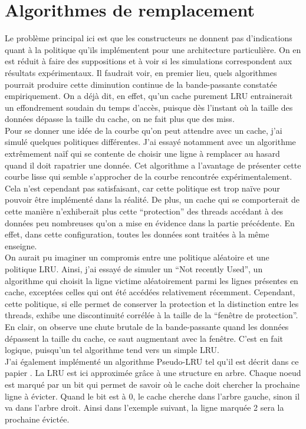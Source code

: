 \documentclass{report}
\begin{document}
\section{Algorithmes de remplacement}
Le problème principal ici est que les constructeurs ne donnent pas d'indications quant
à la politique qu'ils implémentent pour une architecture particulière. On en est 
réduit à faire des suppositions et à voir si les simulations correspondent aux
résultats expérimentaux. Il faudrait voir, en premier lieu, quels algorithmes pourrait
produire cette diminution continue de la bande-passante constatée empiriquement. On a déjà 
dit, en effet, qu'un cache purement LRU entrainerait un effondrement soudain du temps
d'accès, puisque dès l'instant où la taille des données dépasse la taille du cache, on 
ne fait plus que des miss.
\\Pour se donner une idée de la courbe qu'on peut attendre avec un cache, j'ai simulé
quelques politiques différentes. J'ai essayé notamment avec un algorithme extrêmement
naïf qui se contente de choisir une ligne à remplacer au hasard quand il doit rapatrier
une donnée. Cet algorithme a l'avantage de présenter cette courbe lisse qui semble 
s'approcher de la courbe rencontrée expérimentalement. Cela n'est cependant pas 
satisfaisant, car cette politique est trop naïve pour pouvoir être implémenté dans
la réalité. De plus, un cache qui se comporterait de cette manière n'exhiberait plus
cette ``protection'' des threads accédant à des données peu nombreuses qu'on a 
mise en évidence dans la partie précédente. En effet, dans cette configuration,
toutes les données sont traitées à la même enseigne.
\\On aurait pu imaginer un compromis entre une politique aléatoire et une politique
LRU. Ainsi, j'ai essayé de simuler un ``Not recently Used'', un algorithme qui choisit
la ligne victime aléatoirement parmi les lignes présentes en cache, exceptées celles 
qui ont été accédées relativement récemment. Cependant, cette politique, si elle 
permet de conserver la protection et la distinction entre les threads, exhibe une
discontinuité corrélée à la taille de la ``fenêtre de protection''. En clair, on
observe une chute brutale de la bande-passante quand les données dépassent la taille
du cache, ce saut augmentant avec la fenêtre. C'est en fait logique, puisqu'un tel
algorithme tend vers un simple LRU. 
\\J'ai également implémenté un algorithme Pseudo-LRU tel qu'il est décrit dans ce 
papier \cite{plru}. La LRU est ici approximée grâce à une structure en arbre. Chaque
noeud est marqué par un bit qui permet de savoir où le cache doit chercher la 
prochaine ligne à évicter. Quand le bit est à 0, le cache cherche dans l'arbre
gauche, sinon il va dans l'arbre droit. Ainsi dans l'exemple suivant, la ligne
marquée 2 sera la prochaine évictée.
\end{document}
